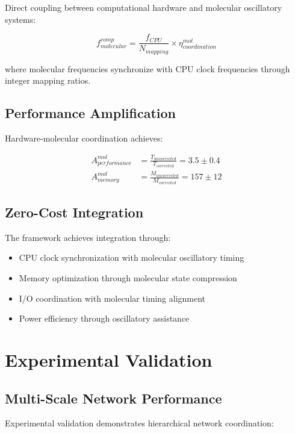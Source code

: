 \documentclass[12pt,a4paper]{article}
\begin{document}
Direct coupling between computational hardware and molecular oscillatory systems:

\begin{equation}
f_{molecular}^{comp} = \frac{f_{CPU}}{N_{mapping}} \times \eta_{coordination}^{mol}
\end{equation}

where molecular frequencies synchronize with CPU clock frequencies through integer mapping ratios.

\subsection{Performance Amplification}

Hardware-molecular coordination achieves:

\begin{align}
A_{performance}^{mol} &= \frac{T_{uncorrected}}{T_{corrected}} = 3.5 \pm 0.4 \\
A_{memory}^{mol} &= \frac{M_{uncorrected}}{M_{corrected}} = 157 \pm 12
\end{align}

\subsection{Zero-Cost Integration}

The framework achieves integration through:
\begin{itemize}
\item CPU clock synchronization with molecular oscillatory timing
\item Memory optimization through molecular state compression
\item I/O coordination with molecular timing alignment
\item Power efficiency through oscillatory assistance
\end{itemize}

\section{Experimental Validation}

\subsection{Multi-Scale Network Performance}

Experimental validation demonstrates hierarchical network coordination:
\end{document}
